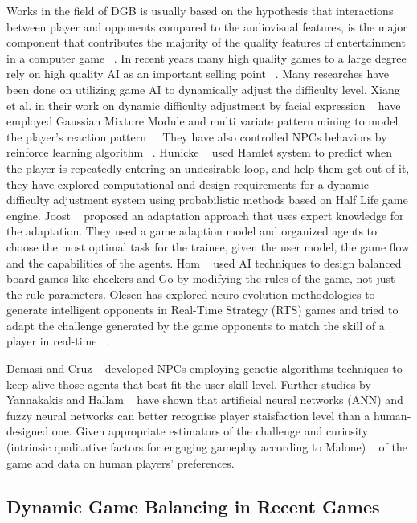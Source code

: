 Works in the field of DGB is usually based on the hypothesis that interactions between player and opponents compared to the audiovisual features, is the major component that contributes the majority of the quality features of entertainment in a computer game ~\cite{schaalevolving}. In recent years many high quality games to a large degree rely on high quality AI as an important selling point ~\cite{forbus2002ai}. Many researches have been done on utilizing game AI to dynamically adjust the difficulty level. Xiang et al. in their work on dynamic difficulty adjustment by facial expression ~\cite{xiang2013dynamic} have employed Gaussian Mixture Module and multi variate pattern mining to model the player's reaction pattern ~\cite{lee2006dynamic, chiu2008using}. They have also controlled NPCs behaviors by reinforce learning algorithm ~\cite{spronck2004difficulty, andrade2005challenge}. Hunicke ~\cite{hunicke2004ai} used Hamlet system to predict when the player is repeatedly entering an undesirable loop, and help them get out of it, they have explored computational and design requirements for a dynamic difficulty adjustment system using probabilistic methods based on Half Life game engine. Joost ~\cite{westra2009adaptive} proposed an adaptation approach that uses expert knowledge for the adaptation. They used a game adaption model and organized agents to choose the most optimal task for the trainee, given the user model, the game flow and the capabilities of the agents. Hom ~\cite{hom2007automatic} used AI techniques to design balanced board games like checkers and Go by modifying the rules of the game, not just the rule parameters. Olesen has explored neuro-evolution methodologies to generate intelligent opponents in Real-Time Strategy (RTS) games and tried to adapt the challenge generated by the game opponents to match the skill of a player in real-time ~\cite{olesen2008real}.

Demasi and Cruz ~\cite{demasi2003line} developed NPCs employing genetic algorithms techniques to keep alive those agents that best fit the user skill level. Further studies by Yannakakis and Hallam ~\cite{yannakakis2006towards} have shown that artificial neural networks (ANN) and fuzzy neural networks can better recognise player staisfaction level than a human-designed one. Given appropriate estimators of the challenge and curiosity (intrinsic qualitative factors for engaging gameplay according to Malone) ~\cite{malone1982makes} of the game and data on human players' preferences.

\subsection{Dynamic Game Balancing in Recent Games}

